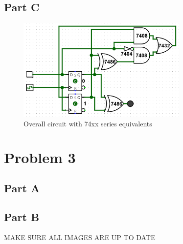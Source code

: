 \documentclass{article}
\begin{document}
\subsection*{Part C}
\begin{figure}[H]
    \centering
    \includegraphics[width=0.75\textwidth]{./images/problem2_circ.png}
    \caption{Overall circuit with 74xx series equivalents}
\end{figure}

\newpage
\section*{Problem 3}

\subsection*{Part A}

\subsection*{Part B}
MAKE SURE ALL IMAGES ARE UP TO DATE
\end{document}
